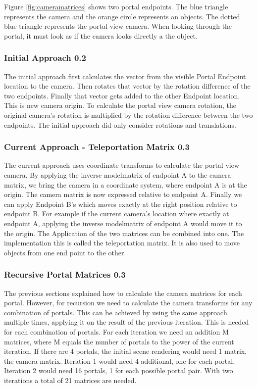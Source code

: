 Figure \ref{fig:cameramatrices} shows two portal endpoints. The blue triangle represents the camera and the orange circle represents an objects. The dotted blue triangle represents the portal view camera.
When looking through the portal, it must look as if the camera looks directly a the object.

\subsubsection{Initial Approach 0.2}
The initial approach first calculates the vector from the visible Portal Endpoint location to the camera. Then rotates that vector by the rotation difference of the two endpoints. Finally that vector gets added to the other Endpoint location. This is new camera origin.
To calculate the portal view camera rotation, the original camera's rotation is multiplied by the rotation difference between the two endpoints.
The initial approach did only consider rotations and translations.

\subsubsection{Current Approach - Teleportation Matrix 0.3}
The current approach uses coordinate transforms to calculate the portal view camera. By applying the inverse modelmatrix of endpoint A to the camera matrix, we bring the camera in a coordinate system, where endpoint A is at the origin. The camera matrix is now expressed relative to endpoint A. Finally we can apply Endpoint B's which moves exactly at the right position relative to endpoint B.
For example if the current camera's location where exactly at endpoint A, applying the inverse modelmatrix of endpoint A would move it to the origin.
The Application of the two matrices can be combined into one. The implementation this is called the teleportation matrix. It is also used to move objects from one end point to the other.  


\subsubsection{Recursive Portal Matrices 0.3}
The previous sections explained how to calculate the camera matrices for each portal. However, for recursion we need to calculate the camera transforms for any combination of portals. This can be achieved by using the same approach multiple times, applying it on the result of the previous iteration. This is needed for each combination of portals. For each iteration we need an addition M matrices, where M equals the number of portals to the power of the current iteration. If there are 4 portals, the initial scene rendering would need 1 matrix, the camera matrix. Iteration 1 would need 4 additional, one for each portal. Iteration 2 would need 16 portals, 1 for each possible portal pair. With two iterations a total of 21 matrices are needed.

